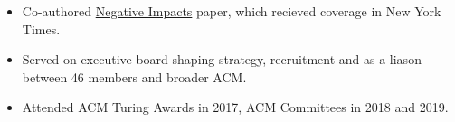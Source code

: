 \documentclass[10pt,a4paper,ragged2e,withhyper]{altacv}
\begin{document}
\begin{paracol}{2}

\smallskip \divider \smallskip


\newpage


\begin{itemize}
\item Co-authored \href{https://acm-fca.org/2018/03/29/negativeimpacts/}{Negative Impacts} paper, which recieved coverage in New York Times.
    \item Served on executive board shaping strategy, recruitment and as a liason between 46 members and broader ACM.
    \item Attended ACM Turing Awards in 2017, ACM Committees in 2018 and 2019.
\end{itemize}

\divider

\end{paracol}
\end{document}
